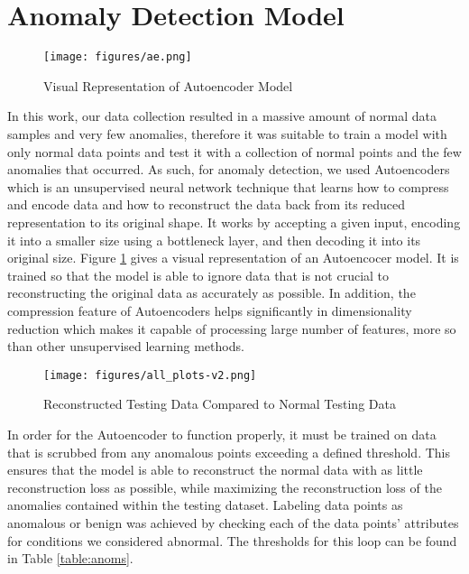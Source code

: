 \section{Anomaly Detection Model}
\label{sec:ml-model}
\begin{figure}[!t]
    \centering
    \texttt{[image: figures/ae.png]}
    \caption{Visual Representation of Autoencoder Model \cite{aediag}}
    \label{fig:modeldiag}
\end{figure}
In this work, our data collection resulted in a massive amount of normal data samples and very few anomalies, therefore it was suitable to train a model with only normal data points and test it with a collection of normal points and the few anomalies that occurred. As such, for anomaly detection, we used Autoencoders \cite{adwithauto} which is an unsupervised neural network technique that learns how to compress and encode data and how to reconstruct the data back from its reduced representation to its original shape. It works by accepting a given input, encoding it into a smaller size using a bottleneck layer, and then decoding it into its original size. Figure \ref{fig:modeldiag} gives a visual representation of an Autoencocer model. It is trained so that the model is able to ignore data that is not crucial to reconstructing the original data as accurately as possible. In addition, the compression feature of Autoencoders helps significantly in dimensionality reduction which makes it capable of processing large number of features, more so than other unsupervised learning methods. %
\begin{figure*}[!t]
    \centering
    \texttt{[image: figures/all\_plots-v2.png]}
    \caption{Reconstructed Testing Data Compared to Normal Testing Data}
    \label{fig:recon}
\end{figure*}
In order for the Autoencoder to function properly, it must be trained on data that is scrubbed from any anomalous points exceeding a defined threshold. This ensures that the model is able to reconstruct the normal data with as little reconstruction loss \cite{guo2018multidimensional} as possible, while maximizing the reconstruction loss of the anomalies contained within the testing dataset. Labeling data points as anomalous or benign was achieved by checking each of the data points' attributes for conditions we considered abnormal. The thresholds for this loop can be found in Table \ref{table:anoms}.
